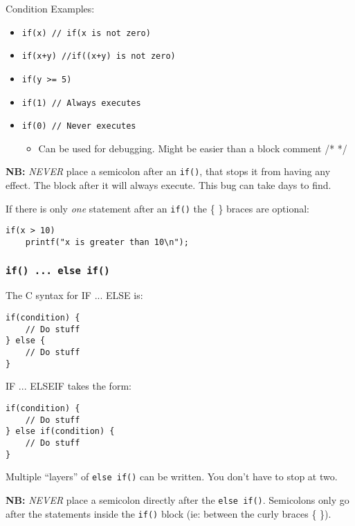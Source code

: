 \documentclass{lab}
\begin{document}
\begin{multicols}{2}
Condition Examples:
\begin{itemize}
\item \texttt{if(x) // if(x is not zero)}
\item \texttt{if(x+y) //if((x+y) is not zero)}
\item \texttt{if(y >= 5)}
\item \texttt{if(1) // Always executes}
\item \texttt{if(0) // Never executes}
	\begin{itemize}
		\item Can be used for debugging. Might be easier than a block comment /* */
	\end{itemize}
\end{itemize}

\textbf{NB:} \textit{NEVER} place a semicolon after an \texttt{if()}, that stops it from having any effect. The block after it will always execute. This bug can take days to find.

If there is only \textit{one} statement after an \texttt{if()} the \{ \} braces are optional:

\begin{lstlisting}[style=CStyle]
if(x > 10) 
	printf("x is greater than 10\n");
\end{lstlisting}


\subsubsection{\texttt{if() ... else if()}}

The C syntax for IF ... ELSE is:

\begin{lstlisting}[style=CStyle]
if(condition) {
	// Do stuff
} else {
	// Do stuff
}
\end{lstlisting}

IF ... ELSEIF takes the form:

\begin{lstlisting}[style=CStyle]
if(condition) {
	// Do stuff
} else if(condition) {
	// Do stuff
}
\end{lstlisting}

Multiple ``layers'' of \texttt{else if()} can be written. You don't have to stop at two.

\textbf{NB:} \textit{NEVER} place a semicolon directly after  the \texttt{else if()}. Semicolons only go after the statements inside the \texttt{if()} block (ie: between the curly braces \{ \}).

\columnbreak

\end{multicols}
\end{document}

